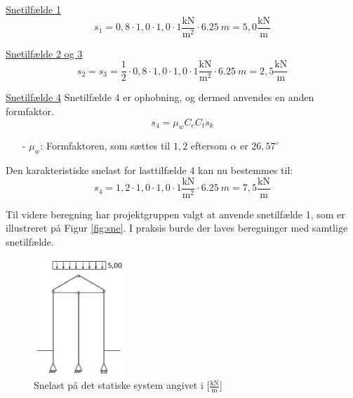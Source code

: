 \underline{Snetilfælde 1}
\begin{equation}
	s_1 = 0,\!8\cdot 1,\!0\cdot 1,\!0\cdot 1 \frac{\text{kN}}{\text{m}^2}\cdot \SI{6,25}{m} = 5,\!0 \frac{\text{kN}}{\text{m}}
\end{equation}

\underline{Snetilfælde 2 og 3}
\begin{equation}
	s_2 = s_3 = \frac{1}{2}\cdot 0,\!8 \cdot 1,\!0 \cdot 1,\!0\cdot 1 \frac{\text{kN}}{\text{m}^2}\cdot \SI{6,25}{m} = 2,\!5 \frac{\text{kN}}{\text{m}}
\end{equation}

\underline{Snetilfælde 4}
\newline
Snetilfælde 4 er ophobning, og dermed anvendes en anden formfaktor.
\begin{equation}
	s_4 = \mu_w C_e C_t s_k
\end{equation}

\begin{itemize}
	\item[-] $\mu_w$: Formfaktoren, som sættes til $1,\!2$ eftersom $\alpha$ er $26,\!57^{\circ}$ \citep[ kapitel 5.3.3]{EU91}
\end{itemize}

Den karakteristiske snelast for lasttilfælde 4 kan nu bestemmes til:
\begin{equation}
	s_4 = 1,\!2\cdot 1,\!0\cdot 1,\!0\cdot 1 \frac{\text{kN}}{\text{m}^2}\cdot \SI{6,25}{m} = 7,\!5 \frac{\text{kN}}{\text{m}}
\end{equation}

Til videre beregning har projektgruppen valgt at anvende snetilfælde 1, som er illustreret på Figur \ref{fig:sne}. I praksis burde der laves beregninger med samtlige snetilfælde.

\begin{figure}[H]
	\centering
	\includegraphics[width=0.3\textwidth]{billeder/snelast.png}
	\caption{Snelast på det statiske system angivet i [$\frac{\text{kN}}{\text{m}}$]}
	\label{fig:snelast}
\end{figure}

